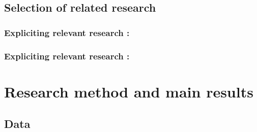 \documentclass[9pt, usenames, dvipsnames]{beamer}
\begin{document}
\subsection{Selection of related research}
\begin{frame}
  \frametitle{Expliciting relevant research : \textcite{Ben-David2018}}
\end{frame}

\begin{frame}
  \frametitle{Expliciting relevant research : \textcite{Israeli2017}}
\end{frame}

\section{Research method and main results}
\subsection{Data}
\end{document}
